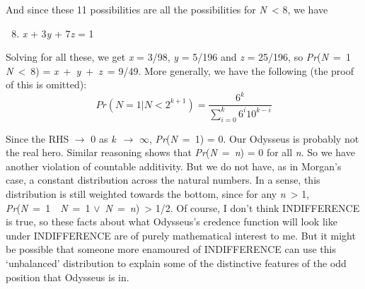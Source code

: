 \noindent And since these 11 possibilities are all the possibilities for \textit{N}~{\textless} 8, we have

\begin{enumerate}
\setcounter{enumi}{7}
\renewcommand{\labelenumi}{(\arabic{enumi})}
\item \textit{x} + 3\textit{y} + 7\textit{z} = 1
\end{enumerate}

\noindent Solving for all these, we get \textit{x} = 3/98, \textit{y} = 5/196 and \textit{z} = 25/196, so \textit{Pr}(\textit{N}~=~1~{\textbar} \textit{N}~{\textless}~8) = \textit{x}~+~\textit{y}~+~\textit{z}~= 9/49. More generally, we have the following (the proof of this is omitted):
\begin{equation}
Pr(N = 1 | N < 2^{k+1}) = \frac{6^k}{\sum_{i=0}^{k}6^i10^{k-i}}
\end{equation}

\noindent Since the RHS ${\rightarrow}$ 0 as \textit{k}~${\rightarrow}$ ${\infty}$, \textit{Pr}(\textit{N}~=~1) = 0. Our Odysseus is probably not the real hero. Similar reasoning shows that \textit{Pr}(\textit{N}~=~\textit{n}) = 0 for all \textit{n}. So we have another violation of countable additivity. But we do not have, as in Morgan's case, a constant distribution across the natural numbers. In a sense, this distribution is still weighted towards the bottom, since for any \textit{n}~{\textgreater} 1, \textit{Pr}(\textit{N}~=~1~{\textbar}~\textit{N}~=~1 ${\vee}$~\textit{N}~=~\textit{n})~{\textgreater} 1/2. Of course, I don't think INDIFFERENCE is true, so these facts about what Odysseus's credence function will look like under INDIFFERENCE are of purely mathematical interest to me. But it might be possible that someone more enamoured of INDIFFERENCE can use this `unbalanced' distribution to explain some of the distinctive features of the odd position that Odysseus is in.
%





